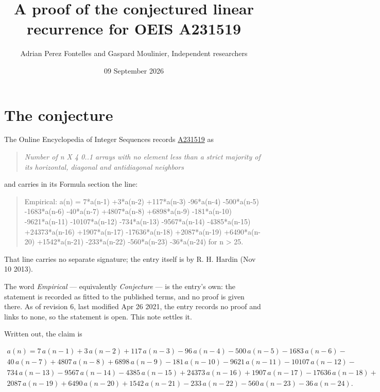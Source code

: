 \documentclass[11pt]{article}
\title{A proof of the conjectured linear recurrence for OEIS A231519}
\author{Adrian Perez Fontelles and Gaspard Moulinier, Independent researchers}
\date{09 September 2026}
\theoremstyle{definition}
\begin{document}
\maketitle
\section{The conjecture}

The Online Encyclopedia of Integer Sequences records \href{https://oeis.org/A231519}{A231519} as

\begin{quote}\itshape Number of n X 4 0..1 arrays with no element less than a strict majority of its horizontal, diagonal and antidiagonal neighbors\end{quote}

and carries in its Formula section the line:

\begin{quote}\ttfamily Empirical: a(n) = 7*a(n-1) +3*a(n-2) +117*a(n-3) -96*a(n-4) -500*a(n-5) -1683*a(n-6) -40*a(n-7) +4807*a(n-8) +6898*a(n-9) -181*a(n-10) -9621*a(n-11) -10107*a(n-12) -734*a(n-13) -9567*a(n-14) -4385*a(n-15) +24373*a(n-16) +1907*a(n-17) -17636*a(n-18) +2087*a(n-19) +6490*a(n-20) +1542*a(n-21) -233*a(n-22) -560*a(n-23) -36*a(n-24) for n > 25.\end{quote}

That line carries no separate signature; the entry itself is by R. H. Hardin (Nov 10 2013).

The word {\itshape Empirical} --- equivalently {\itshape Conjecture} --- is the entry's own: the statement is recorded as fitted to the published terms, and no proof is given there. As of revision 6, last modified Apr 26 2021, the entry records no proof and links to none, so the statement is open. This note settles it.

Written out, the claim is

\begin{multline*} a(n) = 7\,a(n-1) + 3\,a(n-2) + 117\,a(n-3) - 96\,a(n-4) - 500\,a(n-5) - 1683\,a(n-6) - \\ 40\,a(n-7) + 4807\,a(n-8) + 6898\,a(n-9) - 181\,a(n-10) - 9621\,a(n-11) - 10107\,a(n-12) - \\ 734\,a(n-13) - 9567\,a(n-14) - 4385\,a(n-15) + 24373\,a(n-16) + 1907\,a(n-17) - 17636\,a(n-18) + \\ 2087\,a(n-19) + 6490\,a(n-20) + 1542\,a(n-21) - 233\,a(n-22) - 560\,a(n-23) - 36\,a(n-24). \end{multline*}
\end{document}

